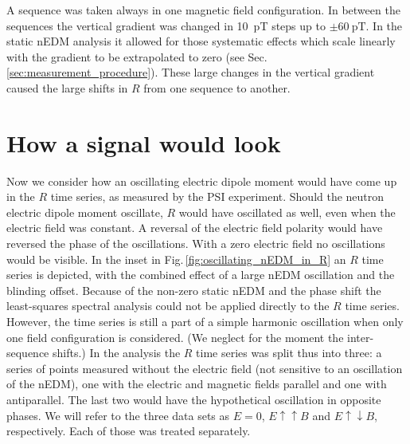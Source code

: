 A sequence was taken always in one magnetic field configuration.
In between the sequences the vertical gradient was changed in \SI{10}{\pico\tesla} steps up to $\pm \SI{60}{\pico\tesla}$.
In the static nEDM analysis it allowed for those systematic effects which scale linearly with the gradient to be extrapolated to zero (see Sec.\,\ref{sec:measurement_procedure}).
These large changes in the vertical gradient caused the large shifts in $R$ from one sequence to another.




\section{How a signal would look}
Now we consider how an oscillating electric dipole moment would have come up in the $R$ time series, as measured by the PSI experiment.
Should the neutron electric dipole moment oscillate, $R$ would have oscillated as well, even when the electric field was constant.
A reversal of the electric field polarity would have reversed the phase of the oscillations.
With a zero electric field no oscillations would be visible.
In the inset in Fig.\,\ref{fig:oscillating_nEDM_in_R} an $R$ time series is depicted, with the combined effect of a large nEDM oscillation and the blinding offset.
Because of the non-zero static nEDM and the phase shift the least-squares spectral analysis could not be applied directly to the $R$ time series.
However, the time series is still a part of a simple harmonic oscillation when only one field configuration is considered.
(We neglect for the moment the inter-sequence shifts.) In the analysis the $R$ time series was split thus into three: a series of points measured without the electric field (not sensitive to an oscillation of the nEDM), one with the electric and magnetic fields parallel and one with antiparallel.
The last two would have the hypothetical oscillation in opposite phases.
We will refer to the three data sets as $E=0$, $E \uparrow \uparrow B$ and $E \uparrow \downarrow B$, respectively.
Each of those was treated separately.

